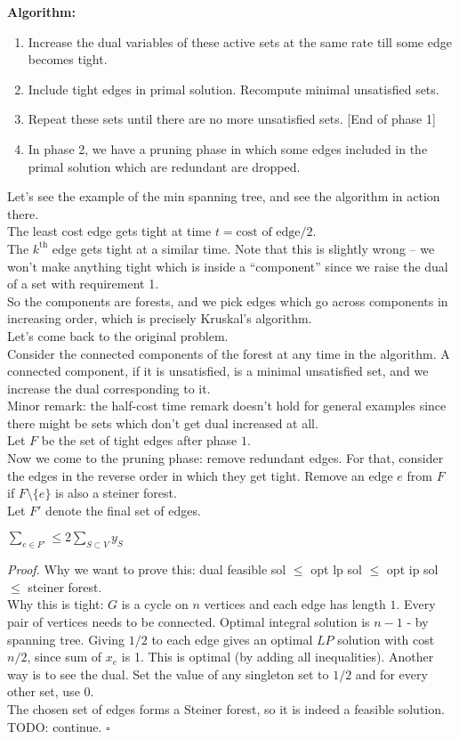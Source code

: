 \documentclass[a4paper]{article}
\newenvironment{proof}{\begin{breakbox}\textit{Proof.}}{\hfill$\square$\end{breakbox}}
\newcommand{\nl}{\vspace{0.2cm}\\}
\begin{document}
\textbf{Algorithm:}
\begin{enumerate}
    \item Increase the dual variables of these active sets at the same rate till some edge becomes tight.
    \item Include tight edges in primal solution. Recompute minimal unsatisfied sets.
    \item Repeat these sets until there are no more unsatisfied sets. [End of phase 1]
    \item In phase 2, we have a pruning phase in which some edges included in the primal solution which are redundant are dropped.
\end{enumerate}
Let's see the example of the min spanning tree, and see the algorithm in action there.\nl
The least cost edge gets tight at time $t = \text{cost of edge}/2$.\nl
The $k^\mathrm{th}$ edge gets tight at a similar time. Note that this is slightly wrong -- we won't make anything tight which is inside a ``component'' since we raise the dual of a set with
requirement 1.\nl
So the components are forests, and we pick edges which go across components in increasing order, which is precisely Kruskal's algorithm.\nl
Let's come back to the original problem.\nl
Consider the connected components of the forest at any time in the algorithm. A connected component, if it is unsatisfied, is a minimal unsatisfied set, and we increase the dual
corresponding to it.\nl
Minor remark: the half-cost time remark doesn't hold for general examples since there might be sets which don't get dual increased at all.\nl
Let $F$ be the set of tight edges after phase $1$.\nl
Now we come to the pruning phase: remove redundant edges. For that, consider the edges in the reverse order in which they get tight. Remove an edge $e$ from $F$ if $F \setminus \{e\}$ is also a
steiner forest.\nl
Let $F'$ denote the final set of edges.\nl
\begin{claim}
    $\sum_{e \in F'} \le 2 \sum_{S \subset V} y_S$
\end{claim}
\begin{proof}
    Why we want to prove this: dual feasible sol $\le$ opt lp sol $\le$ opt ip sol $\le$ steiner forest.\nl
    Why this is tight: $G$ is a cycle on $n$ vertices and each edge has length $1$. Every pair of vertices needs to be connected. Optimal integral solution is $n - 1$ - by spanning tree. Giving
    $1/2$ to each edge gives an optimal $LP$ solution with cost $n/2$, since sum of $x_e$ is 1. This is optimal (by adding all inequalities). Another way is to see the dual. Set the value of any singleton set to $1/2$ and
    for every other set, use $0$.\nl
    The chosen set of edges forms a Steiner forest, so it is indeed a feasible solution.\nl
    TODO: continue.
\end{proof}
\end{document}
